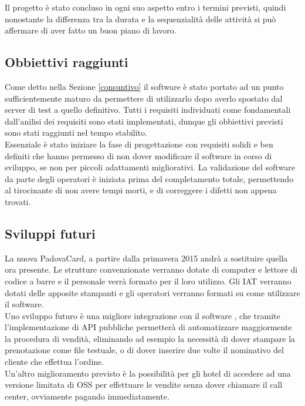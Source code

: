 Il progetto è stato concluso in ogni suo aspetto entro i termini previsti, quindi nonostante la differenza tra la durata e la sequenzialità delle attività si può affermare di aver fatto un buon piano di lavoro.

\subsection{Obbiettivi raggiunti}
Come detto nella Sezione \ref{consuntivo} il software è stato portato ad un punto sufficientemente maturo da permettere di utilizzarlo dopo averlo spostato dal server di test a quello definitivo. Tutti i requisiti individuati come fondamentali dall'anilisi dei requisiti sono stati implementati, dunque gli obbiettivi previsti sono stati raggiunti nel tempo stabilito. \\

Essenziale è stato iniziare la fase di progettazione con requisiti solidi e ben definiti che hanno permesso di non dover modificare il software in corso di sviluppo, se non per piccoli adattamenti migliorativi. La validazione del software da parte degli operatori è iniziata prima del completamento totale, permettendo al tirocinante di non avere tempi morti, e di correggere i difetti non appena trovati.

\subsection{Sviluppi futuri}
La nuova PadovaCard, a partire dalla primavera 2015 andrà a sostituire quella ora presente. Le strutture convenzionate verranno dotate di computer e lettore di codice a barre e il personale verrà formato per il loro utilizzo. Gli IAT verranno dotati delle apposite stampanti e gli operatori verranno formati su come utilizzare il software. \\

Uno sviluppo futuro è una migliore integrazione con il software \tlite, che tramite l'implementazione di API pubbliche permetterà di automatizzare maggiormente la procedura di vendità, eliminando ad esempio la necessità di dover stampare la prenotazione come file testuale, o di dover inserire due volte il nominativo del cliente che effettua l'ordine. \\

Un'altro miglioramento previsto è la possibilità per gli hotel di accedere ad una versione limitata di OSS per effettuare le vendite senza dover chiamare il call center, ovviamente pagando immediatamente.

